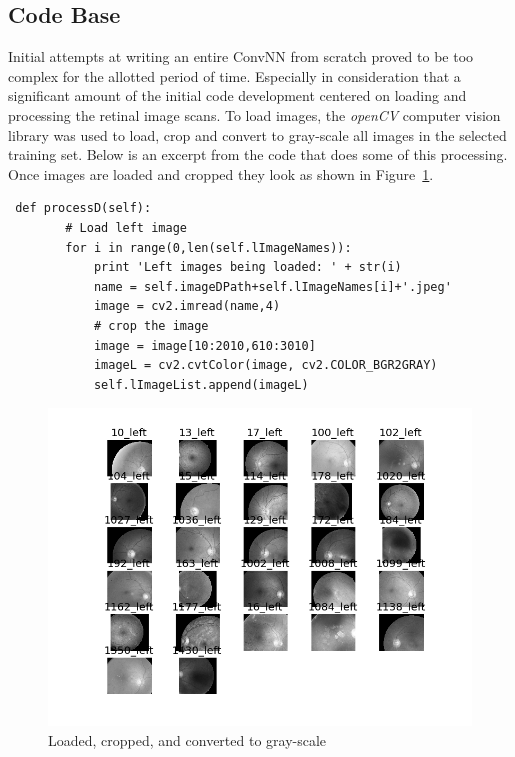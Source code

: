\documentclass[letterpaper,12pt]{article}
\newcommand{\figref}[1]{Figure~\ref{#1}}
\begin{document}
\subsection{Code Base}


Initial attempts at writing an entire ConvNN from scratch proved to be too complex for the allotted period of time. Especially in consideration that a significant amount of the initial code development centered on loading and processing the retinal image scans. To load images, the \textit{openCV} computer vision library was used to load, crop and convert to gray-scale all images in the selected training set. Below is an excerpt from the code that does some of this processing. Once images are loaded and cropped they look as shown in \figref{loaded}.

\begin{verbatim}
 def processD(self):
        # Load left image
        for i in range(0,len(self.lImageNames)):
            print 'Left images being loaded: ' + str(i)
            name = self.imageDPath+self.lImageNames[i]+'.jpeg'
            image = cv2.imread(name,4)
            # crop the image
            image = image[10:2010,610:3010]
            imageL = cv2.cvtColor(image, cv2.COLOR_BGR2GRAY)
            self.lImageList.append(imageL)
\end{verbatim}

\begin{figure}[htbp]
\begin{center}
\includegraphics[scale=0.75]{images/lInitialImages_gray.png}
\caption{Loaded, cropped, and converted to gray-scale}
\label{loaded}
\end{center}
\end{figure}
\end{document}
